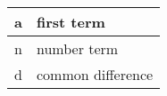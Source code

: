 \begin{center}
\begin{tabular}{ | m{3cm} | m{4cm}| } 
  \hline
  a & first term  \\ 
  \hline
  n & number term \\ 
  \hline
  d & common difference   \\ 
  \hline
\end{tabular}
\end{center}